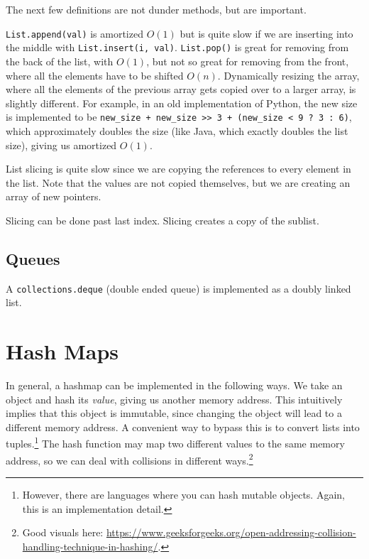 \documentclass{article}
\begin{document}
  The next few definitions are not dunder methods, but are important. 
  \begin{definition}
    \texttt{List.append(val)} is amortized $O(1)$ but is quite slow if we are inserting into the middle with \texttt{List.insert(i, val)}. 
    \texttt{List.pop()} is great for removing from the back of the list, with $O(1)$, but not so great for removing from the front, where all the elements have to be shifted $O(n)$. 
    Dynamically resizing the array, where all the elements of the previous array gets copied over to a larger array, is slightly different. For example, in an old implementation of Python, the new size is implemented to be \texttt{new\_size + new\_size >> 3 + (new\_size < 9 ? 3 : 6)}, which approximately doubles the size (like Java, which exactly doubles the list size), giving us amortized $O(1)$. 
  \end{definition}

  \begin{definition}[Extend]
    
  \end{definition}

  \begin{definition}[Sort]
    
  \end{definition}

  List slicing is quite slow since we are copying the references to every element in the list. Note that the values are not copied themselves, but we are creating an array of new pointers. 

  Slicing can be done past last index. Slicing creates a copy of the sublist. 

  \subsection{Queues}

    A \texttt{collections.deque} (double ended queue) is implemented as a doubly linked list. 

\section{Hash Maps}

    In general, a hashmap can be implemented in the following ways. We take an object and hash its \textit{value}, giving us another memory address. This intuitively implies that this object is immutable, since changing the object will lead to a different memory address. A convenient way to bypass this is to convert lists into tuples.\footnote{However, there are languages where you can hash mutable objects. Again, this is an implementation detail.} The hash function may map two different values to the same memory address, so we can deal with collisions in different ways.\footnote{Good visuals here: \href{https://www.geeksforgeeks.org/open-addressing-collision-handling-technique-in-hashing/}{https://www.geeksforgeeks.org/open-addressing-collision-handling-technique-in-hashing/}.}
\end{document}
